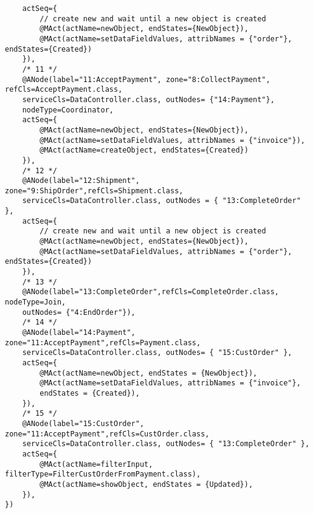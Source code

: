 \begin{verbatim}
	actSeq={
		// create new and wait until a new object is created
		@MAct(actName=newObject, endStates={NewObject}),
		@MAct(actName=setDataFieldValues, attribNames = {"order"}, endStates={Created})
	}),
	/* 11 */    
	@ANode(label="11:AcceptPayment", zone="8:CollectPayment", refCls=AcceptPayment.class,
	serviceCls=DataController.class, outNodes= {"14:Payment"},
	nodeType=Coordinator,      
	actSeq={
		@MAct(actName=newObject, endStates={NewObject}),
		@MAct(actName=setDataFieldValues, attribNames = {"invoice"}),
		@MAct(actName=createObject, endStates={Created})
	}),
	/* 12 */    
	@ANode(label="12:Shipment", zone="9:ShipOrder",refCls=Shipment.class,
	serviceCls=DataController.class, outNodes = { "13:CompleteOrder" },
	actSeq={
		// create new and wait until a new object is created
		@MAct(actName=newObject, endStates={NewObject}),
		@MAct(actName=setDataFieldValues, attribNames = {"order"}, endStates={Created})
	}),
	/* 13 */    
	@ANode(label="13:CompleteOrder",refCls=CompleteOrder.class, nodeType=Join,
	outNodes= {"4:EndOrder"}),
	/* 14 */    
	@ANode(label="14:Payment", zone="11:AcceptPayment",refCls=Payment.class,
	serviceCls=DataController.class, outNodes= { "15:CustOrder" },
	actSeq={
		@MAct(actName=newObject, endStates = {NewObject}),
		@MAct(actName=setDataFieldValues, attribNames = {"invoice"},
		endStates = {Created}),
	}),
	/* 15 */    
	@ANode(label="15:CustOrder", zone="11:AcceptPayment",refCls=CustOrder.class,
	serviceCls=DataController.class, outNodes= { "13:CompleteOrder" },
	actSeq={
		@MAct(actName=filterInput, filterType=FilterCustOrderFromPayment.class),
		@MAct(actName=showObject, endStates = {Updated}),
	}),
})
\end{verbatim}

